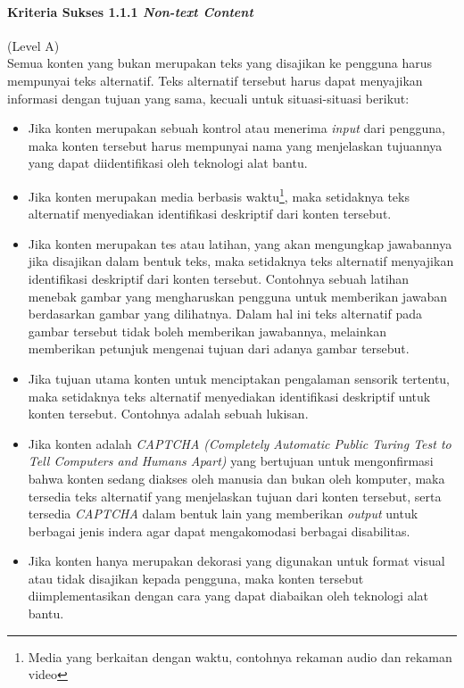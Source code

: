 \paragraph{Kriteria Sukses 1.1.1 \textit{Non-text Content}}
\label{sec:kriteria_sukses_1.1.1}
(Level A)\\

Semua konten yang bukan merupakan teks yang disajikan ke pengguna harus mempunyai teks alternatif. Teks alternatif tersebut harus dapat menyajikan informasi dengan tujuan yang sama, kecuali untuk situasi-situasi berikut:
\begin{itemize}
	\item Jika konten merupakan sebuah kontrol atau menerima \textit{input} dari pengguna, maka konten tersebut harus mempunyai nama yang menjelaskan tujuannya yang dapat diidentifikasi oleh teknologi alat bantu.
	\item Jika konten merupakan media berbasis waktu\footnote{Media yang berkaitan dengan waktu, contohnya rekaman audio dan rekaman video}, maka setidaknya teks alternatif menyediakan identifikasi deskriptif dari konten tersebut.
	\item Jika konten merupakan tes atau latihan, yang akan mengungkap jawabannya jika disajikan dalam bentuk teks, maka setidaknya teks alternatif menyajikan identifikasi deskriptif dari konten tersebut. Contohnya sebuah latihan menebak gambar yang mengharuskan pengguna untuk memberikan jawaban berdasarkan gambar yang dilihatnya. Dalam hal ini teks alternatif pada gambar tersebut tidak boleh memberikan jawabannya, melainkan memberikan petunjuk mengenai tujuan dari adanya gambar tersebut.
	\item Jika tujuan utama konten untuk menciptakan pengalaman sensorik tertentu, maka setidaknya teks alternatif menyediakan identifikasi deskriptif untuk konten tersebut. Contohnya adalah sebuah lukisan.
	\item Jika konten adalah \textit{CAPTCHA (Completely Automatic Public Turing Test to Tell Computers and Humans Apart)} yang bertujuan untuk mengonfirmasi bahwa konten sedang diakses oleh manusia dan bukan oleh komputer, maka tersedia teks alternatif yang menjelaskan tujuan dari konten tersebut, serta tersedia \textit{CAPTCHA} dalam bentuk lain yang memberikan \textit{output} untuk berbagai jenis indera agar dapat mengakomodasi berbagai disabilitas.
	\item Jika konten hanya merupakan dekorasi yang digunakan untuk format visual atau tidak disajikan kepada pengguna, maka konten tersebut diimplementasikan dengan cara yang dapat diabaikan oleh teknologi alat bantu.
\end{itemize}

